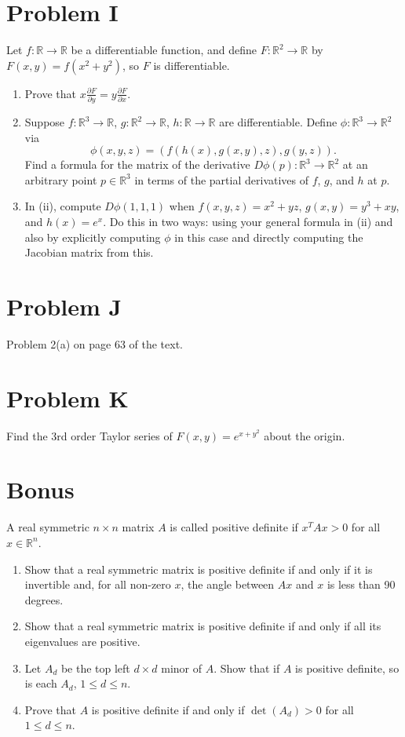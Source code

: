 \documentclass[lang=en,11pt]{template}
\begin{document}
\section*{Problem I}
Let $f : \mathbb{R} \to \mathbb{R}$ be a differentiable function, and define $F : \mathbb{R}^2 \to \mathbb{R}$ by $F(x, y) = f(x^2 + y^2)$, so $F$ is differentiable.

\begin{enumerate}
    \item Prove that $x \frac{\partial F}{\partial y} = y \frac{\partial F}{\partial x}$.
    \item Suppose $f : \mathbb{R}^3 \to \mathbb{R}$, $g : \mathbb{R}^2 \to \mathbb{R}$, $h : \mathbb{R} \to \mathbb{R}$ are differentiable. Define $\phi : \mathbb{R}^3 \to \mathbb{R}^2$ via
    \[
    \phi(x, y, z) = (f(h(x), g(x, y), z), g(y, z)).
    \]
    Find a formula for the matrix of the derivative $D\phi(p) : \mathbb{R}^3 \to \mathbb{R}^2$ at an arbitrary point $p \in \mathbb{R}^3$ in terms of the partial derivatives of $f$, $g$, and $h$ at $p$.
    \item In (ii), compute $D\phi(1, 1, 1)$ when $f(x, y, z) = x^2 + yz$, $g(x, y) = y^3 + xy$, and $h(x) = e^x$. Do this in two ways: using your general formula in (ii) and also by explicitly computing $\phi$ in this case and directly computing the Jacobian matrix from this.
\end{enumerate}

\section*{Problem J}
Problem 2(a) on page 63 of the text.

\section*{Problem K}
Find the 3rd order Taylor series of $F(x, y) = e^{x + y^2}$ about the origin.

\section*{Bonus}
A real symmetric $n \times n$ matrix $A$ is called positive definite if $x^T A x > 0$ for all $x \in \mathbb{R}^n$.
\begin{enumerate}
    \item Show that a real symmetric matrix is positive definite if and only if it is invertible and, for all non-zero $x$, the angle between $Ax$ and $x$ is less than 90 degrees.
    \item Show that a real symmetric matrix is positive definite if and only if all its eigenvalues are positive.
    \item Let $A_d$ be the top left $d \times d$ minor of $A$. Show that if $A$ is positive definite, so is each $A_d$, $1 \leq d \leq n$.
    \item Prove that $A$ is positive definite if and only if $\det(A_d) > 0$ for all $1 \leq d \leq n$.
\end{enumerate}
\end{document}

